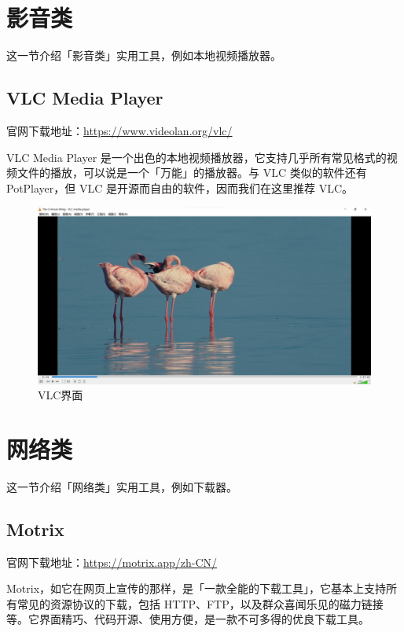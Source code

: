 \section{影音类}

这一节介绍「影音类」实用工具，例如本地视频播放器。

\subsection{VLC Media Player}

官网下载地址：\url{https://www.videolan.org/vlc/}

VLC Media Player 是一个出色的本地视频播放器，它支持几乎所有常见格式的视频文件的播放，可以说是一个「万能」的播放器。与 VLC 类似的软件还有 PotPlayer，但 VLC 是开源而自由的软件，因而我们在这里推荐 VLC。

\begin{figure}[htb!]
  \centering
  \includegraphics[width=.9\textwidth]{assets/VLC.jpg}
  \caption[VLC界面]{VLC界面\footnotemark}
  \label{VLC}
\end{figure}


\section{网络类}

这一节介绍「网络类」实用工具，例如下载器。

\subsection{Motrix}

官网下载地址：\url{https://motrix.app/zh-CN/}

Motrix，如它在网页上宣传的那样，是「一款全能的下载工具」，它基本上支持所有常见的资源协议的下载，包括 HTTP、FTP，以及群众喜闻乐见的磁力链接等。它界面精巧、代码开源、使用方便，是一款不可多得的优良下载工具。


